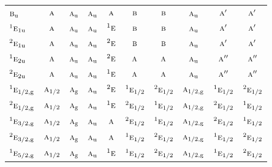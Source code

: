 \documentclass[10pt,a4paper]{article}
\numberwithin{equation}{section}
\newcommand{\irr}[1]{\text{\normalfont\scshape #1}}
\newcommand{\conjpair}[1]{{}^{#1}}
\newcommand{\ptag}[1]{\mathrm{#1}}
\begin{document}
{\begin{longtable}{@{}lccccccccc@{}}
$\irr{b}_{\ptag{u}}$ & $\irr{a}$ & $\irr{a}_{\ptag{u}}$ & $\irr{a}_{\ptag{u}}$ & $\irr{a}$ & $\irr{b}$ & $\irr{b}$ & $\irr{a}_{\ptag{u}}$ & $\irr{a}'$ & $\irr{a}'$\\
$\conjpair{1}\irr{e}_{1\ptag{u}}$ & $\irr{a}$ & $\irr{a}_{\ptag{u}}$ & $\irr{a}_{\ptag{u}}$ & $\conjpair{1}\irr{e}$ & $\irr{b}$ & $\irr{b}$ & $\irr{a}_{\ptag{u}}$ & $\irr{a}'$ & $\irr{a}'$\\
$\conjpair{2}\irr{e}_{1\ptag{u}}$ & $\irr{a}$ & $\irr{a}_{\ptag{u}}$ & $\irr{a}_{\ptag{u}}$ & $\conjpair{2}\irr{e}$ & $\irr{b}$ & $\irr{b}$ & $\irr{a}_{\ptag{u}}$ & $\irr{a}'$ & $\irr{a}'$\\
$\conjpair{1}\irr{e}_{2\ptag{u}}$ & $\irr{a}$ & $\irr{a}_{\ptag{u}}$ & $\irr{a}_{\ptag{u}}$ & $\conjpair{2}\irr{e}$ & $\irr{a}$ & $\irr{a}$ & $\irr{a}_{\ptag{u}}$ & $\irr{a}''$ & $\irr{a}''$\\
$\conjpair{2}\irr{e}_{2\ptag{u}}$ & $\irr{a}$ & $\irr{a}_{\ptag{u}}$ & $\irr{a}_{\ptag{u}}$ & $\conjpair{1}\irr{e}$ & $\irr{a}$ & $\irr{a}$ & $\irr{a}_{\ptag{u}}$ & $\irr{a}''$ & $\irr{a}''$\\
$\conjpair{1}\irr{e}_{1/2,\ptag{g}}$ & $\irr{a}_{1/2}$ & $\irr{a}_{\ptag{g}}$ & $\irr{a}_{\ptag{u}}$ & $\conjpair{2}\irr{e}$ & $\conjpair{1}\irr{e}_{1/2}$ & $\conjpair{2}\irr{e}_{1/2}$ & $\irr{a}_{1/2,\ptag{g}}$ & $\conjpair{1}\irr{e}_{1/2}$ & $\conjpair{2}\irr{e}_{1/2}$\\
$\conjpair{2}\irr{e}_{1/2,\ptag{g}}$ & $\irr{a}_{1/2}$ & $\irr{a}_{\ptag{g}}$ & $\irr{a}_{\ptag{u}}$ & $\conjpair{1}\irr{e}$ & $\conjpair{2}\irr{e}_{1/2}$ & $\conjpair{1}\irr{e}_{1/2}$ & $\irr{a}_{1/2,\ptag{g}}$ & $\conjpair{2}\irr{e}_{1/2}$ & $\conjpair{1}\irr{e}_{1/2}$\\
$\conjpair{1}\irr{e}_{3/2,\ptag{g}}$ & $\irr{a}_{1/2}$ & $\irr{a}_{\ptag{g}}$ & $\irr{a}_{\ptag{u}}$ & $\irr{a}$ & $\conjpair{2}\irr{e}_{1/2}$ & $\conjpair{1}\irr{e}_{1/2}$ & $\irr{a}_{1/2,\ptag{g}}$ & $\conjpair{2}\irr{e}_{1/2}$ & $\conjpair{1}\irr{e}_{1/2}$\\
$\conjpair{2}\irr{e}_{3/2,\ptag{g}}$ & $\irr{a}_{1/2}$ & $\irr{a}_{\ptag{g}}$ & $\irr{a}_{\ptag{u}}$ & $\irr{a}$ & $\conjpair{1}\irr{e}_{1/2}$ & $\conjpair{2}\irr{e}_{1/2}$ & $\irr{a}_{1/2,\ptag{g}}$ & $\conjpair{1}\irr{e}_{1/2}$ & $\conjpair{2}\irr{e}_{1/2}$\\
$\conjpair{1}\irr{e}_{5/2,\ptag{g}}$ & $\irr{a}_{1/2}$ & $\irr{a}_{\ptag{g}}$ & $\irr{a}_{\ptag{u}}$ & $\conjpair{1}\irr{e}$ & $\conjpair{1}\irr{e}_{1/2}$ & $\conjpair{2}\irr{e}_{1/2}$ & $\irr{a}_{1/2,\ptag{g}}$ & $\conjpair{1}\irr{e}_{1/2}$ & $\conjpair{2}\irr{e}_{1/2}$\\

\end{longtable}}
\end{document}
